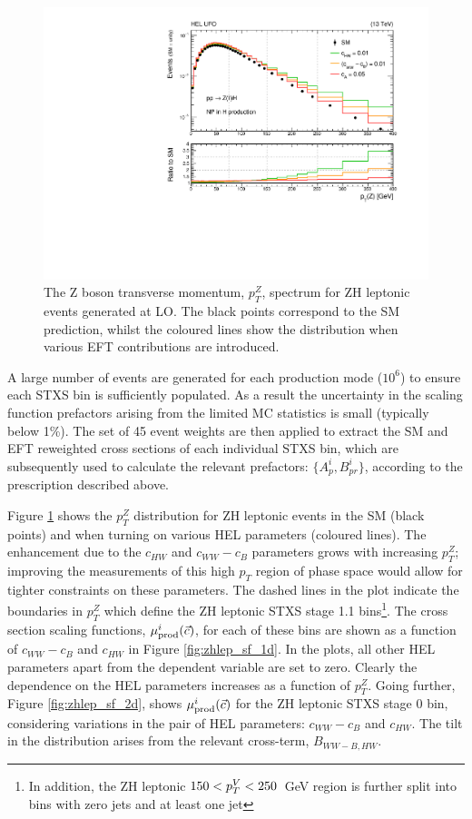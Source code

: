 \begin{figure}[htb!]
  \centering
  \includegraphics[width=.8\textwidth]{Figures/eft/distributions/HEL_PTZ.pdf}
  \caption[$p_T^Z$ distribution for ZH leptonic events with HEL contributions]
  {
    The Z boson transverse momentum, $p_T^Z$, spectrum for ZH leptonic events generated at LO. The black points correspond to the SM prediction, whilst the coloured lines show the distribution when various EFT contributions are introduced.
  }
  \label{fig:zhlep_ptv}
\end{figure}

A large number of events are generated for each production mode ($10^6$) to ensure each STXS bin is sufficiently populated. As a result the uncertainty in the scaling function prefactors arising from the limited MC statistics is small (typically below 1\%). The set of 45 event weights are then applied to extract the SM and EFT reweighted cross sections of each individual STXS bin, which are subsequently used to calculate the relevant prefactors: $\{A^i_p,B^i_{pr}\}$, according to the prescription described above. 


Figure \ref{fig:zhlep_ptv} shows the $p_T^Z$ distribution for ZH leptonic events in the SM (black points) and when turning on various HEL parameters (coloured lines). The enhancement due to the $c_{HW}$ and $c_{WW}-c_B$ parameters grows with increasing $p_T^Z$; improving the measurements of this high $p_T$ region of phase space would allow for tighter constraints on these parameters. The dashed lines in the plot indicate the boundaries in $p_T^Z$ which define the ZH leptonic STXS stage 1.1 bins\footnote{In addition, the ZH leptonic $150<p_T^V<250$~GeV region is further split into bins with zero jets and at least one jet}. The cross section scaling functions, $\mu_{\rm{prod}}^i(\vec{c})$, for each of these bins are shown as a function of $c_{WW}-c_B$ and $c_{HW}$ in Figure \ref{fig:zhlep_sf_1d}. In the plots, all other HEL parameters apart from the dependent variable are set to zero. Clearly the dependence on the HEL parameters increases as a function of $p_T^Z$. Going further, Figure \ref{fig:zhlep_sf_2d}, shows $\mu_{\rm{prod}}^i(\vec{c})$ for the ZH leptonic STXS stage 0 bin, considering variations in the pair of HEL parameters: $c_{WW}-c_B$ and $c_{HW}$. The tilt in the distribution arises from the relevant cross-term, $B_{WW-B,HW}$.


